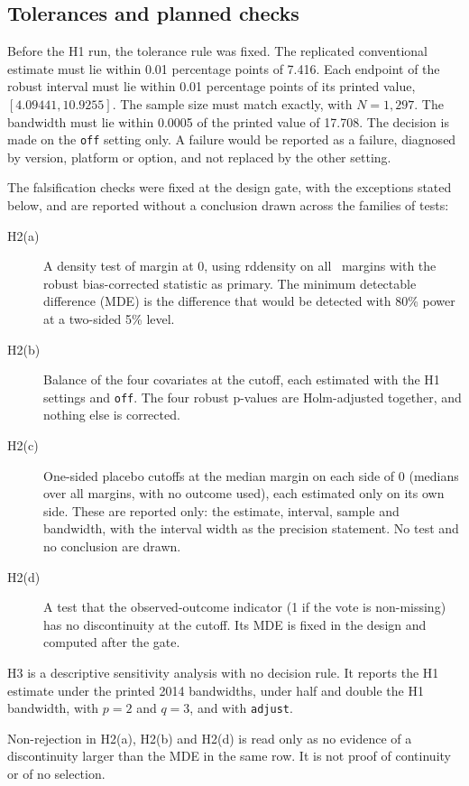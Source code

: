\documentclass[11pt]{article}
\begin{document}
\subsection{Tolerances and planned checks}

Before the H1 run, the tolerance rule was fixed. The replicated conventional estimate must lie within 0.01 percentage points of 7.416. Each endpoint of the robust interval must lie within 0.01 percentage points of its printed value, $[4.09441, 10.9255]$. The sample size must match exactly, with $N=1{,}297$. The bandwidth must lie within 0.0005 of the printed value of 17.708. The decision is made on the \texttt{off} setting only. A failure would be reported as a failure, diagnosed by version, platform or option, and not replaced by the other setting.

The falsification checks were fixed at the design gate, with the exceptions stated below, and are reported without a conclusion drawn across the families of tests:
\begin{description}
\item[H2(a)] A density test of margin at 0, using rddensity on all \RdDensityN\ margins with the robust bias-corrected statistic as primary. The minimum detectable difference (MDE) is the difference that would be detected with 80\% power at a two-sided 5\% level.
\item[H2(b)] Balance of the four covariates at the cutoff, each estimated with the H1 settings and \texttt{off}. The four robust p-values are Holm-adjusted together, and nothing else is corrected.
\item[H2(c)] One-sided placebo cutoffs at the median margin on each side of 0 (medians over all margins, with no outcome used), each estimated only on its own side. These are reported only: the estimate, interval, sample and bandwidth, with the interval width as the precision statement. No test and no conclusion are drawn.
\item[H2(d)] A test that the observed-outcome indicator (1 if the vote is non-missing) has no discontinuity at the cutoff. Its MDE is fixed in the design and computed after the gate.
\end{description}
H3 is a descriptive sensitivity analysis with no decision rule. It reports the H1 estimate under the printed 2014 bandwidths, under half and double the H1 bandwidth, with $p=2$ and $q=3$, and with \texttt{adjust}.

Non-rejection in H2(a), H2(b) and H2(d) is read only as no evidence of a discontinuity larger than the MDE in the same row. It is not proof of continuity or of no selection.
\end{document}
